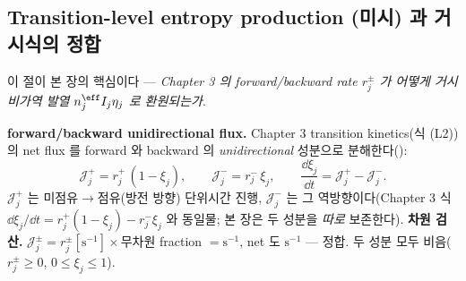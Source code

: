 \subsection{Transition-level entropy production (미시) 과 거시식의 정합}\label{sec:ch4_tr}
이 절이 본 장의 핵심이다 — \emph{Chapter 3 의 forward/backward rate $r_j^\pm$ 가 어떻게 거시 비가역 발열
$n_j^{\eff}I_j\eta_j$ 로 환원되는가}.

\textbf{forward/backward unidirectional flux.} Chapter 3 transition kinetics(식 (L2))의 net flux 를 forward 와
backward 의 \emph{unidirectional} 성분으로 분해한다():
\begin{equation}
\mathcal J_j^+=r_j^+\,(1-\xi_j),\qquad \mathcal J_j^-=r_j^-\,\xi_j,\qquad
\frac{\dd\xi_j}{\dd t}=\mathcal J_j^+-\mathcal J_j^-.
\label{eq:ch4_Jpm}
\end{equation}
$\mathcal J_j^+$ 는 미점유$\to$점유(방전 방향) 단위시간 진행, $\mathcal J_j^-$ 는 그 역방향이다(Chapter 3
식 $\dd\xi_j/\dd t=r_j^+(1-\xi_j)-r_j^-\xi_j$ 와 동일물; 본 장은 두 성분을 \emph{따로} 보존한다). \textbf{차원
검산.} $\mathcal J_j^\pm=r_j^\pm[\mathrm{s^{-1}}]\times$무차원 fraction $=\mathrm{s^{-1}}$, net 도 $\mathrm{s^{-1}}$
— 정합. 두 성분 모두 비음($r_j^\pm\ge0$, $0\le\xi_j\le1$).


